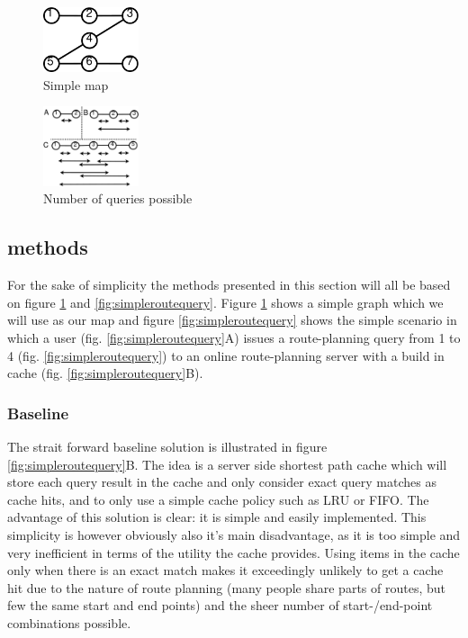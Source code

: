 
\begin{figure}
  \center
	\includegraphics[width=0.25\textwidth]{figures/simpleMap.pdf}
	\caption{Simple map}
  \label{fig:simplemap}
\end{figure}

\begin{figure}
  \center
	\includegraphics[width=0.25\textwidth]{figures/queryprob.pdf}
	\caption{Number of queries possible}
  \label{fig:queryprob}
\end{figure}

\subsection{methods}

For the sake of simplicity the methods presented in this section will all be based on figure \ref{fig:simplemap} and \ref{fig:simpleroutequery}. Figure \ref{fig:simplemap} shows a simple graph which we will use as our map and figure \ref{fig:simpleroutequery} shows the simple scenario in which a user (fig. \ref{fig:simpleroutequery}A) issues a route-planning query from 1 to 4 (fig. \ref{fig:simpleroutequery})  to an online route-planning server with a build in cache (fig. \ref{fig:simpleroutequery}B).


\subsubsection{Baseline}\label{baselinemethod}
The strait forward baseline solution is illustrated in figure \ref{fig:simpleroutequery}B. The idea is a server side shortest path cache which will store each query result in the cache and only consider exact query matches as cache hits, and to only use a simple cache policy such as LRU or FIFO.
The advantage of this solution is clear: it is simple and easily implemented. 
This simplicity is however obviously also it's main disadvantage, as it is too simple and very inefficient in terms of the utility the cache provides. Using items in the cache only when there is an exact match makes it exceedingly unlikely to get a cache hit due to the nature of route planning (many people share parts of routes, but few the same start and end points) and the sheer number of start-/end-point combinations possible.

